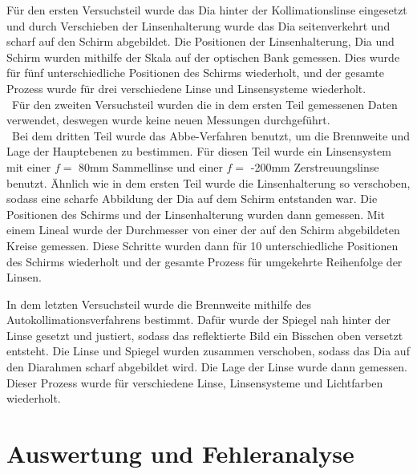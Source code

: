 \documentclass[11pt,a4paper]{article}
\begin{document}
Für den ersten Versuchsteil wurde das Dia hinter der Kollimationslinse eingesetzt und durch Verschieben der Linsenhalterung wurde das Dia seitenverkehrt und scharf auf den Schirm abgebildet.
Die Positionen der Linsenhalterung, Dia und Schirm wurden mithilfe der Skala auf der optischen Bank gemessen. Dies wurde für fünf unterschiedliche Positionen des Schirms wiederholt, und der gesamte Prozess wurde für drei verschiedene Linse und Linsensysteme wiederholt. 
\\\
Für den zweiten Versuchsteil wurden die in dem ersten Teil gemessenen Daten verwendet, deswegen wurde keine neuen Messungen durchgeführt. 
\\\
Bei dem dritten Teil wurde das Abbe-Verfahren benutzt, um die Brennweite und Lage der Hauptebenen zu bestimmen. Für diesen Teil wurde ein Linsensystem mit einer $f=$ 80mm Sammellinse und einer $f=$ -200mm Zerstreuungslinse benutzt. Ähnlich wie in dem ersten Teil wurde die Linsenhalterung so verschoben, sodass eine scharfe Abbildung der Dia auf dem Schirm entstanden war. Die Positionen des Schirms und der Linsenhalterung wurden dann gemessen. Mit einem Lineal wurde der Durchmesser von einer der auf den Schirm abgebildeten Kreise gemessen. Diese Schritte wurden dann für 10 unterschiedliche Positionen des Schirms wiederholt und der gesamte Prozess für umgekehrte Reihenfolge der Linsen. 

In dem letzten Versuchsteil wurde die Brennweite mithilfe des Autokollimationsverfahrens bestimmt. Dafür wurde der Spiegel nah hinter der Linse gesetzt und justiert, sodass das reflektierte Bild ein Bisschen oben versetzt entsteht. Die Linse und Spiegel wurden zusammen verschoben, sodass das Dia auf den Diarahmen scharf abgebildet wird. Die Lage der Linse wurde dann gemessen. Dieser Prozess wurde für verschiedene Linse, Linsensysteme und Lichtfarben wiederholt.

\section{Auswertung und Fehleranalyse}
\end{document}
